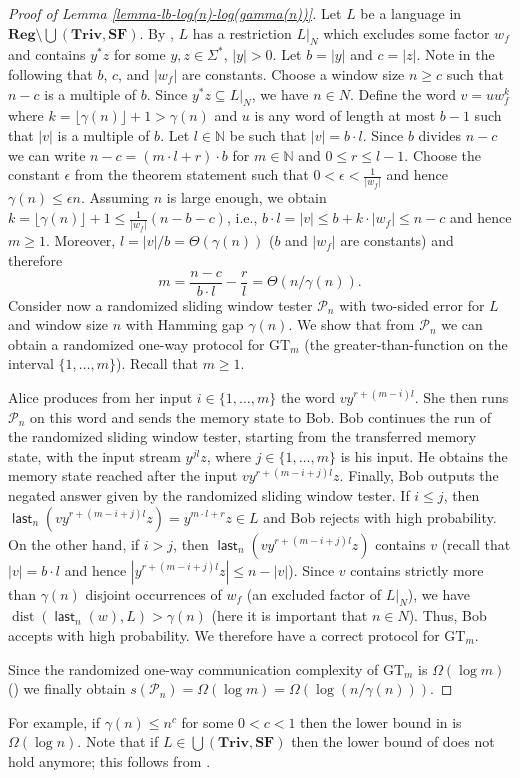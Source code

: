 \documentclass{theoretics}
\newcommand{\N}{\mathbb{N}}
\renewcommand{\P}{\mathcal{P}}
\DeclareMathOperator{\last}{\mathsf{last}}
\DeclareMathOperator{\dist}{dist}
\newcommand{\Reg}{\mathbf{Reg}}
\newcommand{\Triv}{\mathbf{Triv}}
\newcommand{\SF}{\mathbf{SF}}
\renewcommand{\geq}{\geqslant}
\renewcommand{\leq}{\leqslant}
\renewcommand{\ge}{\geq}
\renewcommand{\le}{\leq}
\begin{document}
\begin{proof}[Proof of Lemma \ref{lemma-lb-log(n)-log(gamma(n))}]
Let $L$ be a language in $\Reg \setminus  \bigcup(\Triv, \SF)$. By ,
$L$ has a restriction $L|_N$ which excludes some factor $w_f$
and contains $y^*z$ for some $y,z \in \Sigma^*$, $|y| > 0$.
Let $b = |y|$ and $c = |z|$. Note in the following that $b$, $c$, and $|w_f|$ are constants.
Choose a window size $n \ge c$ such that $n-c$ is a multiple of $b$. Since $y^*z \subseteq L|_N$, we have $n \in N$.
Define the word $v = u w_f^k$ where $k = \lfloor \gamma(n) \rfloor + 1 > \gamma(n)$ 
and $u$ is any word of length at most $b-1$ such that $|v|$ is a multiple of $b$. Let $l \in \N$ be such that $|v| = b \cdot l$. Since $b$ divides $n-c$ we can write
$n-c = (m \cdot l + r) \cdot b$ for $m \in \N$ and $0 \le r \le l-1$.
Choose the constant $\epsilon$ from the theorem statement such that
$0 < \epsilon < \frac{1}{|w_f|}$ and hence $\gamma(n) \leq \epsilon n$. 
 Assuming $n$ is large enough, we obtain 
$k =  \lfloor \gamma(n) \rfloor + 1 \leq \frac{1}{|w_f|} (n-b-c)$, i.e., 
$b \cdot l = |v| \leq b+ k \cdot |w_f|  \leq n-c$ and hence $m \geq 1$.
Moreover,  $l = |v|/b = \Theta(\gamma(n))$ ($b$ and $|w_f|$ are constants) and therefore 
$$
m = \frac{n-c}{b \cdot l} - \frac{r}{l} = \Theta(n/\gamma(n)).
$$
Consider now a randomized sliding window tester $\P_n$ with two-sided error for $L$ and window size $n$
with Hamming gap $\gamma(n)$.
We show that from $\P_n$ we can obtain a randomized one-way protocol for $\mathrm{GT}_m$ (the greater-than-function on the interval $\{1,\ldots,m\}$). Recall that $m \geq 1$.

Alice produces from her input $i \in \{1,\ldots,m\}$ the word 
$v y^{r+ (m-i) l}$.
She then runs $\P_n$ on this word and sends the memory state to Bob.
Bob continues the run of the randomized sliding window tester, starting from the transferred memory state,
with the input stream $y^{j l} z$, where $j \in \{1,\ldots,m\}$ is his input.
He obtains the memory state reached after the input $v y^{r+(m-i+j) l} z$.
Finally, Bob outputs the negated answer given by the randomized sliding window tester.
If $i \le j$, then $\last_n(v y^{r+(m-i+j) l} z) = y^{m \cdot l + r} z  \in L$ and Bob rejects with high probability.
On the other hand, if $i > j$, then $\last_n(v y^{r+ (m-i+j) l} z)$ contains $v$ (recall that $|v| = b \cdot l$ and hence 
$|y^{r+(m-i+j) l} z| \leq n-|v|$). Since $v$ contains strictly more than $\gamma(n)$ disjoint occurrences of $w_f$ (an excluded factor of $L|_N$),
we have $\dist(\last_n(w),L) > \gamma(n)$ (here it is important that $n \in N$).
Thus, Bob accepts with high probability. We therefore have a correct protocol for $\mathrm{GT}_m$.

Since the randomized one-way communication complexity of $\mathrm{GT}_m$ is $\Omega(\log m)$ () we finally obtain
$s(\P_n) = \Omega(\log m) = \Omega(\log(n/\gamma(n)))$.
\end{proof}
For example, if $\gamma(n) \le n^c$ for some $0 < c < 1$ then the lower bound in  is $\Omega(\log n)$.
Note that if $L \in \bigcup(\Triv,\SF)$ then the lower bound of  does not hold anymore;
this follows from .
\end{document}

